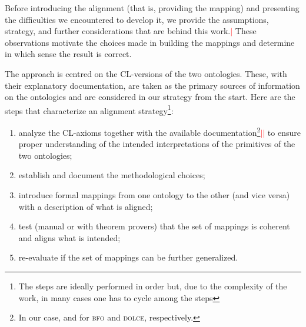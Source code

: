 \documentclass[ao]{iosart2x}
\newcommand{\nb}[1]{\textcolor{red}{$|$}\marginpar{\hspace*{-0cm}\parbox{20mm}{\scriptsize\raggedright\textcolor{red}{#1}}}}
\newcommand{\dolce}{{\textsc{dolce}}}
\newcommand{\bfo}{{\textsc{bfo}}}
\begin{document}
Before introducing the alignment (that is, providing the mapping) and presenting the difficulties we encountered to develop it, we provide the assumptions, strategy, and further considerations that are behind this work.\nb{SB: changed} These observations motivate the choices made in building the mappings and determine in which sense the result is correct.

The approach is centred on the CL-versions of the two ontologies. These, with their explanatory documentation, are taken as the primary sources of information on the ontologies and are considered in our strategy from the start. 
Here are the steps that characterize an alignment strategy\footnote{The steps are ideally performed in order but, due to the complexity of the work, in many cases one has to cycle among the steps}:
\begin{enumerate}[({\bf S}1)]
\item analyze the CL-axioms together with the available documentation\footnote{In our case, \citep{barryBasicFormalOntology2015} and \citep{D18} for {\bfo} and {\dolce}, respectively.}\nb{CM: non sono riuscito a trovare dove è disponibila la versione aggiornata che spiega BFO 2020 che abbiamo usato noi [FC:  esiste tale versione? Io ho solo trovato questo sito https://basic-formal-ontology.org/bfo-2020.html che contiene anche ISO scaricabile.]}\nb{SB: non è quella fornita Alan su github?} to ensure proper understanding of the intended interpretations of the primitives of the two ontologies; %
 \item establish and document the methodological choices;
\item introduce formal mappings from one ontology to the other (and vice versa) with a description of what is aligned;
\item test (manual or with theorem provers) that the set of mappings is coherent and aligns what is intended;
\item re-evaluate if the set of mappings can be further generalized.
\end{enumerate}
\end{document}

